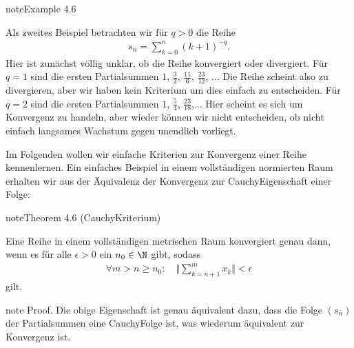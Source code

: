 \documentclass[letterpaper,10pt,english]{jupyterBook}
\begin{document}
\begin{sphinxadmonition}{note}{Example 4.6}



Als zweites Beispiel betrachten wir für \(q > 0\) die Reihe
\begin{equation*}
\begin{split} s_n = \sum_{k=0}^n (k+1)^{-q}.\end{split}
\end{equation*}
Hier ist zunächst völlig unklar, ob die Reihe konvergiert oder divergiert. Für \(q=1\) sind die ersten Partialsummen \(1\), \(\frac{3}2\), \(\frac{11}6\), \(\frac{23}{12}\), \(\ldots\) Die Reihe scheint also zu divergieren, aber wir haben kein Kriterium um dies einfach zu entscheiden. Für \(q=2\) sind die ersten Partialsummen \(1\), \(\frac{5}4\), \(\frac{23}{18}\),\(\ldots\) Hier scheint es sich um Konvergenz zu handeln, aber wieder können wir nicht entscheiden, ob nicht einfach langsames Wachstum gegen unendlich vorliegt.
\end{sphinxadmonition}

Im Folgenden wollen wir einfache Kriterien zur Konvergenz einer Reihe kennenlernen. Ein einfaches Beispiel in einem vollständigen normierten Raum erhalten wir aus der Äquivalenz der Konvergenz zur Cauchy\sphinxhyphen{}Eigenschaft einer Folge:
\label{metrik/reihen:theorem-3}
\begin{sphinxadmonition}{note}{Theorem 4.6 (Cauchy\sphinxhyphen{}Kriterium)}



Eine Reihe in einem vollständigen metrischen Raum konvergiert genau dann, wenn es für alle \(\epsilon > 0\) ein \(n_0 \in \N\) gibt, sodass
\begin{equation*}
\begin{split} \forall m > n \geq n_0: \quad \Vert \sum_{k=n+1}^m x_k \Vert < \epsilon\end{split}
\end{equation*}
gilt.
\end{sphinxadmonition}

\begin{sphinxadmonition}{note}
Proof.  Die obige Eigenschaft ist genau äquivalent dazu, dass die Folge \((s_n)\) der Partialsummen eine Cauchy\sphinxhyphen{}Folge ist, was wiederum äquivalent zur Konvergenz ist.
\end{sphinxadmonition}
\end{document}
